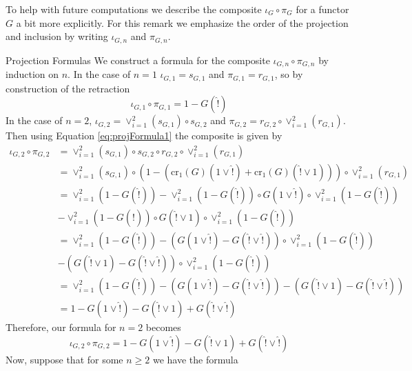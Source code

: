 To help with future computations we describe the composite $\iota_G\circ \pi_G$ for a functor $G$ a bit more explicitly. For this remark we emphasize the order of the projection and inclusion by writing $\iota_{G,n}$ and $\pi_{G,n}$.

\begin{rmk}{Projection Formulas}
    We construct a formula for the composite $\iota_{G,n}\circ \pi_{G,n}$ by induction on $n$. In the case of $n = 1$ $\iota_{G,1} = s_{G,1}$ and $\pi_{G,1} = r_{G,1}$, so by construction of the retraction
    \begin{equation}\label{eq:endoForm1}
        \iota_{G,1}\circ \pi_{G,1} = 1-G(\hat{!})
    \end{equation}
    In the case of $n = 2$, $\iota_{G,2} = \lor_{i=1}^2(s_{G,1})\circ s_{G,2}$ and $\pi_{G,2} = r_{G,2}\circ \lor_{i=1}^2(r_{G,1})$. Then using Equation \ref{eq:projFormula1} the composite is given by
    \begin{align*}
        \iota_{G,2}\circ \pi_{G,2} &= \lor_{i=1}^2(s_{G,1})\circ s_{G,2}\circ r_{G,2}\circ \lor_{i=1}^2(r_{G,1}) \\
        &= \lor_{i=1}^2(s_{G,1})\circ (1-(\text{cr}_1(G)(1\lor\hat{!})+\text{cr}_1(G)(\hat{!}\lor 1))) \circ \lor_{i=1}^2(r_{G,1}) \\
        &= \lor_{i=1}^2(1-G(\hat{!}))-\lor_{i=1}^2(1-G(\hat{!}))\circ G(1\lor\hat{!})\circ \lor_{i=1}^2(1-G(\hat{!}))\\
        &-\lor_{i=1}^2(1-G(\hat{!}))\circ G(\hat{!}\lor 1)\circ \lor_{i=1}^2(1-G(\hat{!})) \\
        &= \lor_{i=1}^2(1-G(\hat{!}))-(G(1\lor\hat{!})-G(\hat{!}\lor \hat{!}))\circ \lor_{i=1}^2(1-G(\hat{!}))\\
        &-(G(\hat{!}\lor 1)-G(\hat{!}\lor \hat{!}))\circ \lor_{i=1}^2(1-G(\hat{!})) \\
        &= \lor_{i=1}^2(1-G(\hat{!}))-(G(1\lor\hat{!})-G(\hat{!}\lor \hat{!}))-(G(\hat{!}\lor 1)-G(\hat{!}\lor \hat{!})) \\
        &= 1-G(1\lor \hat{!})-G(\hat{!}\lor 1)+G(\hat{!}\lor \hat{!})
    \end{align*}
    Therefore, our formula for $n = 2$ becomes
    \begin{equation}\label{eq:endoForm2}
        \iota_{G,2}\circ \pi_{G,2} = 1-G(1\lor \hat{!})-G(\hat{!}\lor 1)+G(\hat{!}\lor \hat{!})
    \end{equation}
    Now, suppose that for some $n \geq 2$ we have the formula
    \begin{equation*}

\end{equation*}
\end{rmk}
